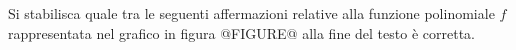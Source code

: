 Si stabilisca quale tra le seguenti affermazioni relative alla funzione polinomiale $f$
rappresentata nel grafico in figura @FIGURE@ alla fine del testo è
corretta.
